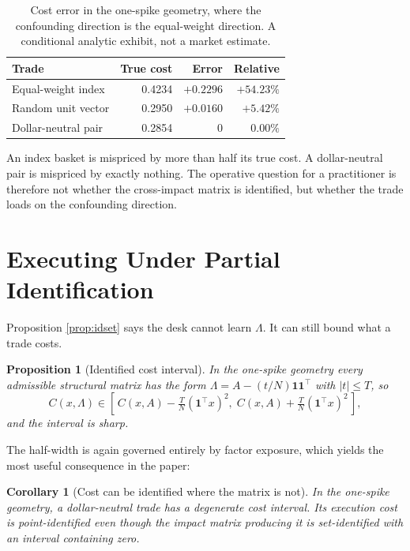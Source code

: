 \documentclass[10pt,twocolumn]{article}
\newtheorem{proposition}{Proposition}
\newtheorem{corollary}{Corollary}
\theoremstyle{remark}
\begin{document}
\begin{table}[t]
\centering
\caption{Cost error in the one-spike geometry, where the confounding direction
is the equal-weight direction. A conditional analytic exhibit, not a market
estimate.}
\label{tab:cost}
\small
\begin{tabular}{@{}lrrr@{}}
\toprule
Trade & True cost & Error & Relative \\
\midrule
Equal-weight index & 0.4234 & $+0.2296$ & $\mathbf{+54.23\%}$ \\
Random unit vector & 0.2950 & $+0.0160$ & $+5.42\%$ \\
Dollar-neutral pair & 0.2854 & $0$ & $\mathbf{0.00\%}$ \\
\bottomrule
\end{tabular}
\end{table}

An index basket is mispriced by more than half its true cost. A dollar-neutral
pair is mispriced by exactly nothing. The operative question for a practitioner
is therefore not whether the cross-impact matrix is identified, but whether the
trade loads on the confounding direction.

\section{Executing Under Partial Identification}
\label{sec:robust}

Proposition \ref{prop:idset} says the desk cannot learn $\Lambda$. It can still
bound what a trade costs.

\begin{proposition}[Identified cost interval]
\label{prop:costint}
In the one-spike geometry every admissible structural matrix has the form
$\Lambda=A-(t/N)\mathbf 1\mathbf 1^\top$ with $|t|\le T$, so
\begin{equation}
C(x,\Lambda)\in\left[\,C(x,A)-\tfrac{T}{N}(\mathbf 1^\top x)^2,\;
C(x,A)+\tfrac{T}{N}(\mathbf 1^\top x)^2\,\right],
\label{eq:costint}
\end{equation}
and the interval is sharp.
\end{proposition}

The half-width is again governed entirely by factor exposure, which yields the
most useful consequence in the paper:

\begin{corollary}[Cost can be identified where the matrix is not]
\label{cor:pointid}
\emph{In the one-spike geometry}, a dollar-neutral trade has a degenerate cost
interval. Its execution cost is point-identified even though the impact matrix
producing it is set-identified with an interval containing zero.
\end{corollary}
\end{document}
